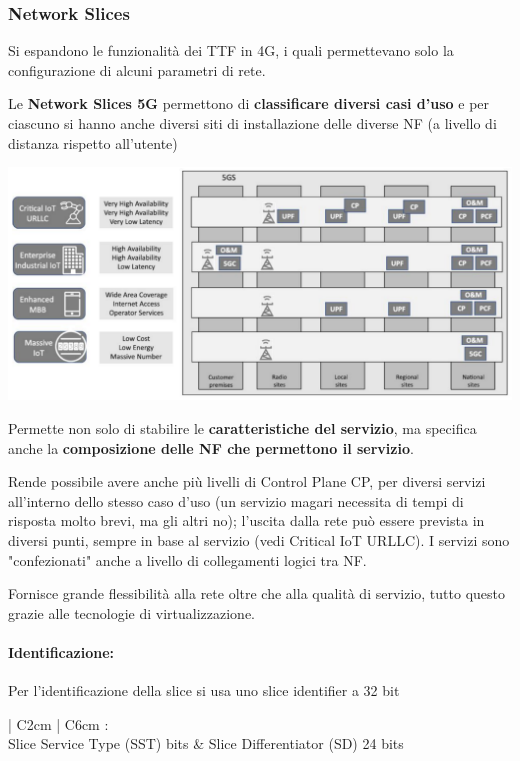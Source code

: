 \subsubsection{Network Slices}

Si espandono le funzionalità dei TTF in 4G, i quali permettevano solo la configurazione di alcuni parametri di rete. 

Le \textbf{Network Slices 5G} permettono di \textbf{classificare diversi casi d'uso} e per ciascuno si hanno anche diversi siti di installazione delle diverse NF (a livello di distanza rispetto all'utente)
\begin{center}
	\includegraphics[width=0.99\linewidth]{img/5g/slicing}
\end{center}

Permette non solo di stabilire le \textbf{caratteristiche del servizio}, ma specifica anche la \textbf{composizione delle NF che permettono il servizio}. 

Rende possibile avere anche più livelli di Control Plane CP, per diversi servizi all'interno dello stesso caso d'uso (un servizio magari necessita di tempi di risposta molto brevi, ma gli altri no); l'uscita dalla rete può essere prevista in diversi punti, sempre in base al servizio (vedi Critical IoT URLLC). I servizi sono "confezionati" anche a livello di collegamenti logici tra NF.

Fornisce grande flessibilità alla rete oltre che alla qualità di servizio, tutto questo grazie alle tecnologie di virtualizzazione.

\paragraph{Identificazione:} Per l'identificazione della slice si usa uno slice identifier a 32 bit
\begin{center}
	\begin{tabular}{| C{2cm} | C{6cm} :}
		 \\
		 
		Slice Service Type (SST)  bits & Slice Differentiator (SD) 24 bits \\
		 
	\end{tabular}
\end{center}

